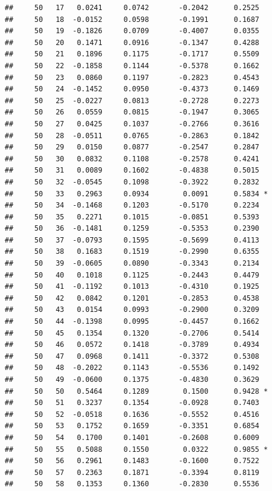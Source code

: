 \documentclass[
]{article}
\begin{document}
\begin{verbatim}
##     50   17   0.0241     0.0742       -0.2042      0.2525  
##     50   18  -0.0152     0.0598       -0.1991      0.1687  
##     50   19  -0.1826     0.0709       -0.4007      0.0355  
##     50   20   0.1471     0.0916       -0.1347      0.4288  
##     50   21   0.1896     0.1175       -0.1717      0.5509  
##     50   22  -0.1858     0.1144       -0.5378      0.1662  
##     50   23   0.0860     0.1197       -0.2823      0.4543  
##     50   24  -0.1452     0.0950       -0.4373      0.1469  
##     50   25  -0.0227     0.0813       -0.2728      0.2273  
##     50   26   0.0559     0.0815       -0.1947      0.3065  
##     50   27   0.0425     0.1037       -0.2766      0.3616  
##     50   28  -0.0511     0.0765       -0.2863      0.1842  
##     50   29   0.0150     0.0877       -0.2547      0.2847  
##     50   30   0.0832     0.1108       -0.2578      0.4241  
##     50   31   0.0089     0.1602       -0.4838      0.5015  
##     50   32  -0.0545     0.1098       -0.3922      0.2832  
##     50   33   0.2963     0.0934        0.0091      0.5834 *
##     50   34  -0.1468     0.1203       -0.5170      0.2234  
##     50   35   0.2271     0.1015       -0.0851      0.5393  
##     50   36  -0.1481     0.1259       -0.5353      0.2390  
##     50   37  -0.0793     0.1595       -0.5699      0.4113  
##     50   38   0.1683     0.1519       -0.2990      0.6355  
##     50   39  -0.0605     0.0890       -0.3343      0.2134  
##     50   40   0.1018     0.1125       -0.2443      0.4479  
##     50   41  -0.1192     0.1013       -0.4310      0.1925  
##     50   42   0.0842     0.1201       -0.2853      0.4538  
##     50   43   0.0154     0.0993       -0.2900      0.3209  
##     50   44  -0.1398     0.0995       -0.4457      0.1662  
##     50   45   0.1354     0.1320       -0.2706      0.5414  
##     50   46   0.0572     0.1418       -0.3789      0.4934  
##     50   47   0.0968     0.1411       -0.3372      0.5308  
##     50   48  -0.2022     0.1143       -0.5536      0.1492  
##     50   49  -0.0600     0.1375       -0.4830      0.3629  
##     50   50   0.5464     0.1289        0.1500      0.9428 *
##     50   51   0.3237     0.1354       -0.0928      0.7403  
##     50   52  -0.0518     0.1636       -0.5552      0.4516  
##     50   53   0.1752     0.1659       -0.3351      0.6854  
##     50   54   0.1700     0.1401       -0.2608      0.6009  
##     50   55   0.5088     0.1550        0.0322      0.9855 *
##     50   56   0.2961     0.1483       -0.1600      0.7522  
##     50   57   0.2363     0.1871       -0.3394      0.8119  
##     50   58   0.1353     0.1360       -0.2830      0.5536  

\end{verbatim}
\end{document}
